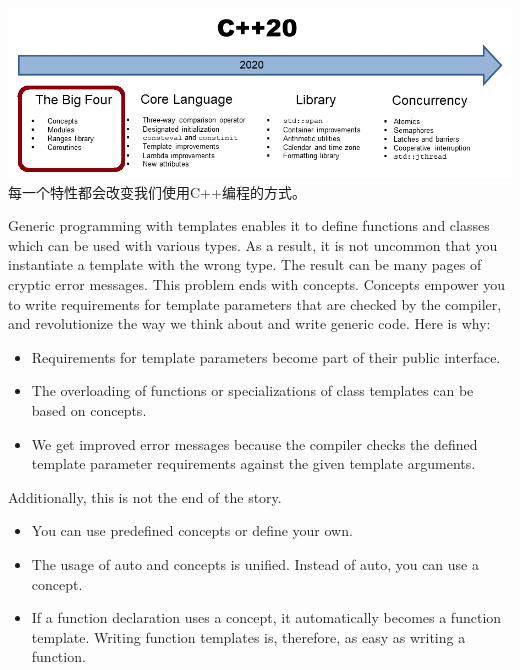 


\begin{center}
\includegraphics[width=1.0\textwidth]{content/2/chapter3/images/2.png}\\
每一个特性都会改变我们使用C++编程的方式。
\end{center}


Generic programming with templates enables it to define functions and classes which can be used with various types. As a result, it is not uncommon that you instantiate a template with the wrong type. The result can be many pages of cryptic error messages. This problem ends with concepts. Concepts empower you to write requirements for template parameters that are checked by the compiler, and revolutionize the way we think about and write generic code. Here is why:

\begin{itemize}
\item 
Requirements for template parameters become part of their public interface.

\item 
The overloading of functions or specializations of class templates can be based on concepts.

\item 
We get improved error messages because the compiler checks the defined template parameter requirements against the given template arguments.
\end{itemize}

Additionally, this is not the end of the story.

\begin{itemize}
\item 
You can use predefined concepts or define your own.

\item 
The usage of auto and concepts is unified. Instead of auto, you can use a concept.

\item 
If a function declaration uses a concept, it automatically becomes a function template. Writing function templates is, therefore, as easy as writing a function.
\end{itemize}

